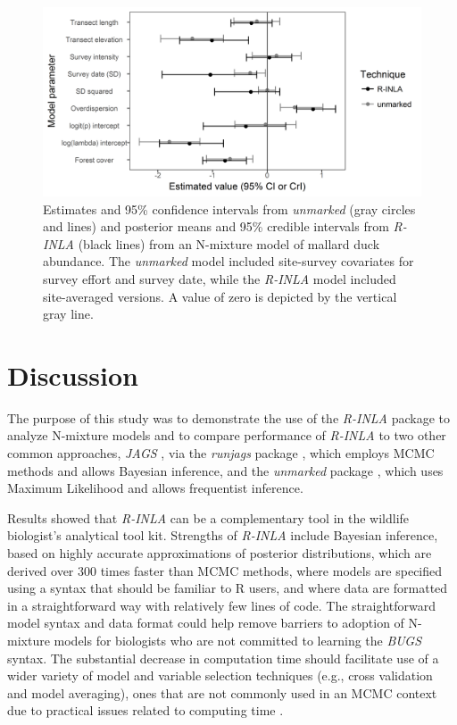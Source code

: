 \documentclass{article}
\begin{document}
\begin{figure}
  \includegraphics[width=\linewidth]{fig3.png}
  \caption{Estimates and 95\% confidence intervals from \emph{unmarked} (gray circles and lines) and posterior means and 95\% credible intervals from \emph{R-INLA} (black lines) from an N-mixture model of mallard duck abundance.  The \emph{unmarked} model included site-survey covariates for survey effort and survey date, while the \emph{R-INLA} model included site-averaged versions.  A value of zero is depicted by the vertical gray line.}
  \label{fig:fig3}
\end{figure}

\section[Discussion]{Discussion}
The purpose of this study was to demonstrate the use of the \emph{R-INLA} package \citep{Rue_Riebler_Sorbye_Illian_Simpson_Lindgren_2017} to analyze N-mixture models and to compare performance of \emph{R-INLA} to two other common approaches, \emph{JAGS} \citep{plummer2003jags,Lunn_Jackson_Best_Thomas_Spiegelhalter_2012}, via the \emph{runjags} package \citep{Denwood_2016}, which employs MCMC methods and allows Bayesian inference, and the \emph{unmarked} package \citep{Fiske_Chandler_others_2011}, which uses Maximum Likelihood and allows frequentist inference.

Results showed that \emph{R-INLA} can be a complementary tool in the wildlife biologist's analytical tool kit. Strengths of \emph{R-INLA} include Bayesian inference, based on highly accurate approximations of posterior distributions, which are derived over 300 times faster than MCMC methods, where models are specified using a syntax that should be familiar to R users, and where data are formatted in a straightforward way with relatively few lines of code. The straightforward model syntax and data format could help remove  barriers to adoption of N-mixture models for biologists who are not committed to learning the \emph{BUGS} syntax. The substantial decrease in computation time should facilitate use of a wider variety of model and variable selection techniques (e.g., cross validation and model averaging), ones that are not commonly used in an MCMC context due to practical issues related to computing time \citep{Kery_Schaub_2011}.
\end{document}
